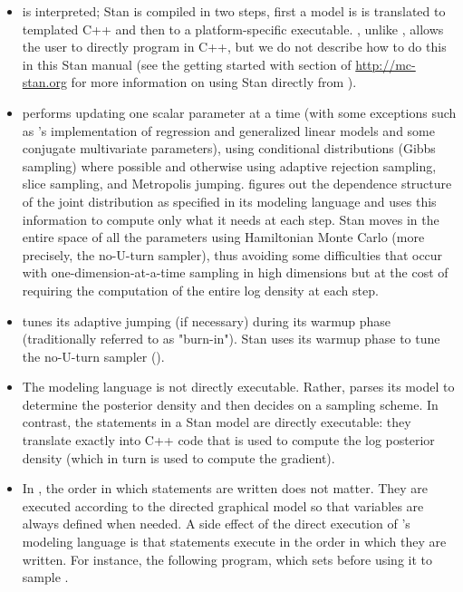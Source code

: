 \begin{itemize}
\item \BUGS is interpreted; Stan is compiled in two steps, first a
  model is is translated to templated C++ and then to a
  platform-specific executable.  \Stan, unlike \BUGS, allows the user
  to directly program in C++, but we do not describe how to do this in
  this Stan manual (see the getting started with \Cpp section of
  \url{http://mc-stan.org} for more information on using Stan directly
  from \Cpp). 
\item \BUGS performs \MCMC updating one scalar parameter at a time
  (with some exceptions such as \JAGS's implementation of regression
  and generalized linear models and some conjugate multivariate
  parameters), using conditional distributions (Gibbs sampling) where
  possible and otherwise using adaptive rejection sampling, slice
  sampling, and Metropolis jumping.  \BUGS figures out the dependence
  structure of the joint distribution as specified in its modeling
  language and uses this information to compute only what it needs at
  each step.  Stan moves in the entire space of all the parameters
  using Hamiltonian Monte Carlo (more precisely, the no-U-turn
  sampler), thus avoiding some difficulties that occur with
  one-dimension-at-a-time sampling in high dimensions but at the cost
  of requiring the computation of the entire log density at each step.
\item \BUGS tunes its adaptive jumping (if necessary) during its
  warmup phase (traditionally referred to as "burn-in").  Stan uses
  its warmup phase to tune the no-U-turn sampler (\NUTS).
\item The \BUGS modeling language is not directly executable.  Rather,
  \BUGS parses its model to determine the posterior density and then
  decides on a sampling scheme.  In contrast, the statements in a Stan
  model are directly executable: they translate exactly into C++ code
  that is used to compute the log posterior density (which in turn is
  used to compute the gradient).
\item In \BUGS, the order in which statements are written does not
  matter.  They are executed according to the directed graphical model
  so that variables are always defined when needed.  A side effect of
  the direct execution of \Stan's modeling language is that statements
  execute in the order in which they are written.  For instance, the
  following \Stan program, which sets  before using it to
  sample .
%
\begin{quote}

\end{quote}
\end{itemize}
